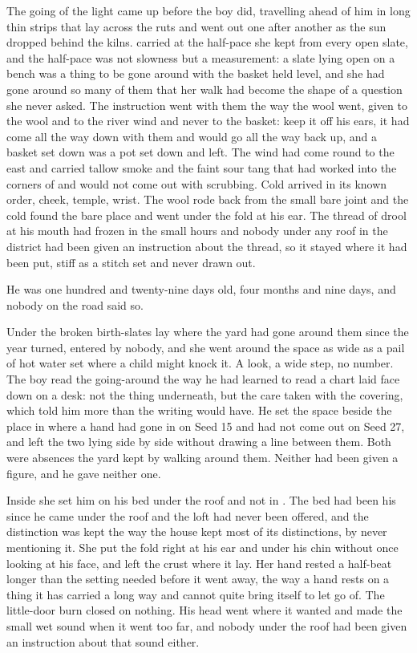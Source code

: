 The going of the light came up  before the boy did, travelling ahead of him in long thin strips that lay across the ruts and went out one after another as the sun dropped behind the kilns.  carried  at the half-pace she kept from every open slate, and the half-pace was not slowness but a measurement: a slate lying open on a bench was a thing to be gone around with the basket held level, and she had gone around so many of them that her walk had become the shape of a question she never asked. The instruction went with them the way the wool went, given to the wool and to the river wind and never to the basket: keep it off his ears, it had come all the way down with them and would go all the way back up, and a basket set down was a pot set down and left. The wind had come round to the east and carried tallow smoke and the faint sour tang that had worked into the corners of  and would not come out with scrubbing. Cold arrived in its known order, cheek, temple, wrist. The wool rode back from the small bare joint and the cold found the bare place and went under the fold at his ear. The thread of drool at his mouth had frozen in the small hours and nobody under any roof in the district had been given an instruction about the thread, so it stayed where it had been put, stiff as a stitch set and never drawn out.

He was one hundred and twenty-nine days old, four months and nine days, and nobody on the road said so.

Under  the broken birth-slates lay where the yard had gone around them since the year turned, entered by nobody, and she went around the space as wide as a pail of hot water set where a child might knock it. A look, a wide step, no number. The boy read the going-around the way he had learned to read a chart laid face down on a desk: not the thing underneath, but the care taken with the covering, which told him more than the writing would have. He set the space beside the place in  where a hand had gone in on Seed 15 and had not come out on Seed 27, and left the two lying side by side without drawing a line between them. Both were absences the yard kept by walking around them. Neither had been given a figure, and he gave neither one.

Inside  she set him on his bed under the roof and not in . The bed had been his since he came under the roof and the loft had never been offered, and the distinction was kept the way the house kept most of its distinctions, by never mentioning it. She put the fold right at his ear and under his chin without once looking at his face, and left the crust where it lay. Her hand rested a half-beat longer than the setting needed before it went away, the way a hand rests on a thing it has carried a long way and cannot quite bring itself to let go of. The little-door burn closed on nothing. His head went where it wanted and made the small wet sound when it went too far, and nobody under the roof had been given an instruction about that sound either.


